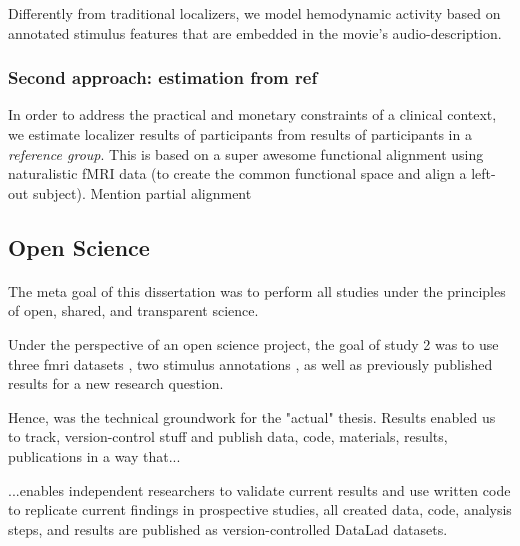 Differently from traditional localizers, we model hemodynamic activity based on
annotated stimulus features that are embedded in the movie's audio-description.



\subsubsection{Second approach: estimation from ref}



%
In order to address the practical and monetary constraints of a clinical
context, we estimate localizer results of participants from results of
participants in a \textit{reference group}.
%
This is based on a super awesome functional alignment using naturalistic fMRI
data (to create the common functional space and align a left-out subject).
%
Mention partial alignment



\subsection{Open Science}

\paragraph{\citet{halchenko2021datalad}}


%
The meta goal of this dissertation was to perform all studies under the
principles of open, shared, and transparent science.

Under the perspective of an open science project, the goal of study 2 was to use
three \ac{fmri} datasets \citep{hanke2014audiomovie, hanke2016simultaneous,
sengupta2016extension}, two stimulus annotations \citep{haeusler2021speechanno,
haeusler2016cutanno}, as well as previously published results
\citep{sengupta2016extension} for a new research question.

%
Hence, \citet{halchenko2021datalad} was the technical groundwork for the
"actual" thesis.
%
Results enabled us to track, version-control stuff and publish data, code,
materials, results, publications in a way that...

%
...enables independent researchers to validate current results and use written
code to replicate current findings in prospective studies, all created data,
code, analysis steps, and results are published as version-controlled DataLad
\citep[\href{www.datalad.org}{datalad.org};][]{halchenko2021datalad} datasets.



